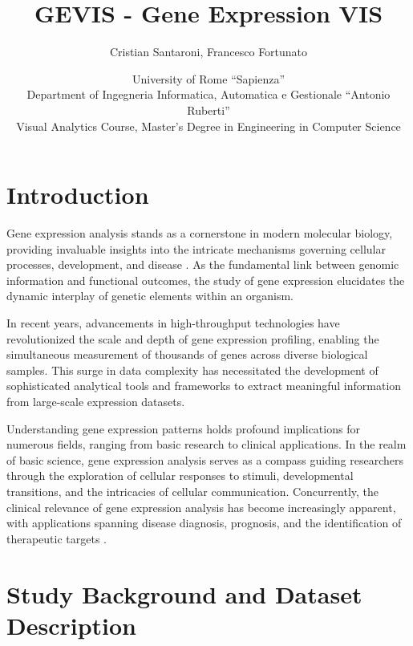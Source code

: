 \documentclass[
	a4paper, %
	10pt, %
	unnumberedsections, %
	twoside, %
]{LTJournalArticle}
\title{GEVIS - Gene Expression VIS} %
\author{%
	Cristian Santaroni, Francesco Fortunato 
}
\date{\footnotesize University of Rome ``Sapienza''\\ Department of Ingegneria Informatica, Automatica e Gestionale ``Antonio Ruberti''\\ Visual Analytics Course, Master's Degree in Engineering in Computer Science}
\begin{document}
\maketitle %


\section{Introduction}

Gene expression analysis stands as a cornerstone in modern molecular biology, providing invaluable insights into the intricate mechanisms governing cellular processes, development, and disease \cite{rosati2024differential}. As the fundamental link between genomic information and functional outcomes, the study of gene expression elucidates the dynamic interplay of genetic elements within an organism.

In recent years, advancements in high-throughput technologies have revolutionized the scale and depth of gene expression profiling, enabling the simultaneous measurement of thousands of genes across diverse biological samples. This surge in data complexity has necessitated the development of sophisticated analytical tools and frameworks to extract meaningful information from large-scale expression datasets. 

Understanding gene expression patterns holds profound implications for numerous fields, ranging from basic research to clinical applications. In the realm of basic science, gene expression analysis serves as a compass guiding researchers through the exploration of cellular responses to stimuli, developmental transitions, and the intricacies of cellular communication. Concurrently, the clinical relevance of gene expression analysis has become increasingly apparent, with applications spanning disease diagnosis, prognosis, and the identification of therapeutic targets \cite{rosati2024differential}.


\section{Study Background and Dataset Description}
\end{document}
